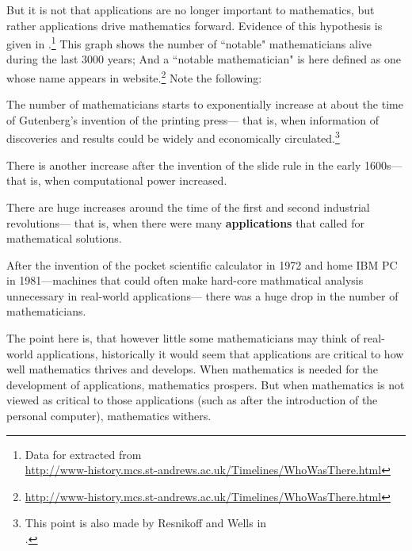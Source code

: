 But it is not that applications are no longer important to mathematics,
but rather applications drive mathematics forward.
Evidence of this hypothesis is given in 
.\footnote{Data for  extracted from \\
  \url{http://www-history.mcs.st-andrews.ac.uk/Timelines/WhoWasThere.html}}
This graph shows the number of ``notable" mathematicians alive during the last 3000 years;
And a ``notable mathematician" is here defined as one whose name appears
in   
website.\footnote{\url{http://www-history.mcs.st-andrews.ac.uk/Timelines/WhoWasThere.html}}
Note the following:
\begin{liste}

\item The number of mathematicians starts to exponentially increase at 
about the time of Gutenberg's invention of the printing press---
that is, when information of discoveries and results could be widely and economically 
circulated.\footnote{This point is also made by Resnikoff and Wells in\\
.}

\item There is another increase after the invention of the slide rule in the early 1600s---
that is, when computational power increased.

\item There are huge increases around the time of the first and second industrial revolutions---
that is, when there were many {\bf applications} that called for mathematical solutions.

\item After the invention of the pocket scientific calculator in 1972 
and home IBM PC in 1981---machines that could 
often make hard-core mathmatical analysis unnecessary in real-world applications---
there was a huge drop in the number of mathematicians.

\end{liste}

The point here is, that however little some mathematicians may think of 
real-world applications,
historically it would seem that applications are critical to 
how well mathematics thrives and develops. 
When mathematics is needed for the development of applications, 
mathematics prospers.
But when mathematics is not viewed as critical to those applications
(such as after the introduction of the personal computer), 
mathematics withers.


